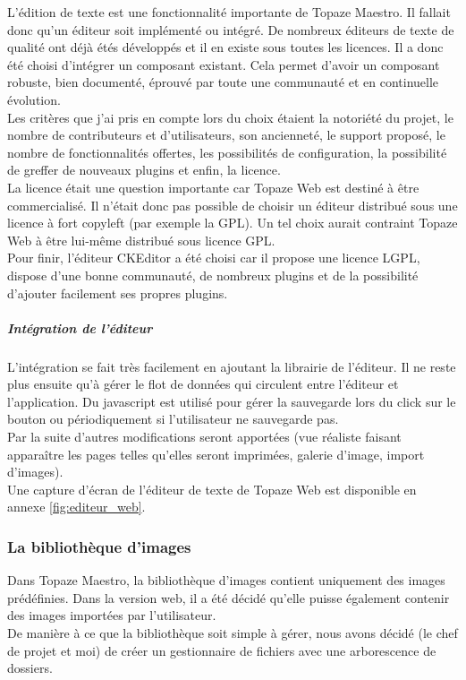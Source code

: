 L’édition de texte est une fonctionnalité importante de Topaze Maestro. Il fallait donc qu’un éditeur soit implémenté ou intégré. De nombreux éditeurs de texte de qualité ont déjà étés développés et il en existe sous toutes les licences. Il a donc été choisi d’intégrer un composant existant. Cela permet d’avoir un composant robuste, bien documenté, éprouvé par toute une communauté et en continuelle évolution.\\

Les critères que j’ai pris en compte lors du choix étaient la notoriété du projet, le nombre de contributeurs et d’utilisateurs, son ancienneté, le support proposé, le nombre de fonctionnalités offertes, les possibilités de configuration, la possibilité de greffer de nouveaux plugins et enfin, la licence.\\

La licence était une question importante car Topaze Web est destiné à être commercialisé. Il n’était donc pas possible de choisir un éditeur distribué sous une licence à fort copyleft (par exemple la GPL). Un tel choix aurait contraint Topaze Web à être lui-même distribué sous licence GPL.\\

Pour finir, l’éditeur CKEditor a été choisi car il propose une licence LGPL, dispose d’une bonne communauté, de nombreux plugins et de la possibilité d’ajouter facilement ses propres plugins.

\subparagraph*{Intégration de l’éditeur\\}
L’intégration se fait très facilement en ajoutant la librairie de l’éditeur. Il ne reste plus ensuite qu’à gérer le flot de données qui circulent entre l’éditeur et l’application. Du javascript est utilisé pour gérer la sauvegarde lors du click sur le bouton ou périodiquement si l’utilisateur ne sauvegarde pas.\\

Par la suite d’autres modifications seront apportées (vue réaliste faisant apparaître les pages telles qu’elles seront imprimées, galerie d’image, import d’images).\\

Une capture d'écran de l'éditeur de texte de Topaze Web est disponible en annexe \ref{fig:editeur_web}.

\subsubsection{La bibliothèque d'images}
Dans Topaze Maestro, la bibliothèque d'images contient uniquement des images prédéfinies. Dans la version web, il a été décidé qu'elle puisse également contenir des images importées par l'utilisateur.\\
De manière à ce que la bibliothèque soit simple à gérer, nous avons décidé (le chef de projet et moi) de créer un gestionnaire de fichiers avec une arborescence de dossiers.

